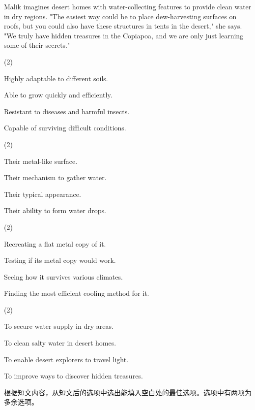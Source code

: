 \documentclass{英语试卷}
\begin{document}
\par Malik imagines desert homes with water-collecting features to provide clean water in dry regions. "The easiest way could be to place dew-harvesting surfaces on roofs, but you could also have these structures in tents in the desert," she says. "We truly have hidden treasures in the Copiapoa, and we are only just learning some of their secrets."\par
{}
\begin{choices}(2)
  \item Highly adaptable to different soils.
  \item Able to grow quickly and efficiently.
  \item Resistant to diseases and harmful insects.
  \item Capable of surviving difficult conditions.
\end{choices}
\begin{choices}(2)
  \item Their metal-like surface.
  \item Their mechanism to gather water.
  \item Their typical appearance.
  \item Their ability to form water drops.
\end{choices}
\begin{choices}(2)
  \item Recreating a flat metal copy of it.
  \item Testing if its metal copy would work.
  \item Seeing how it survives various climates.
  \item Finding the most efficient cooling method for it.
\end{choices}
\begin{choices}(2)
  \item To secure water supply in dry areas.
  \item To clean salty water in desert homes.
  \item To enable desert explorers to travel light.
  \item To improve ways to discover hidden treasures.
\end{choices}
\par 根据短文内容，从短文后的选项中选出能填入空白处的最佳选项。选项中有两项为多余选项。\par
\end{document}
